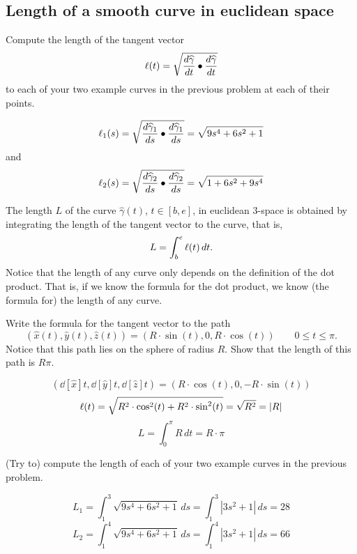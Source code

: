 \documentclass[newpage,hints,handout,nooutcomes,noauthor,12pt]{ximera}
\begin{document}
\subsection{Length of a smooth curve in euclidean space}

\begin{problem}
Compute the length of the tangent vector
\[
\l(t)=\sqrt{\frac{d\hat{\gamma}}{dt}\bullet\frac{d\hat{\gamma}}{dt}}%
\]
to each of your two example curves in the previous problem at each of
their points.



\begin{freeResponse}
\[
\ell_{1}(s) = \sqrt{\frac{d\widehat{\gamma}_{1}}{ds}\bullet\frac{d\widehat{\gamma}_{1}}{ds}} = \sqrt{9s^4 + 6s^2 +1}
\] and
\[ 
\ell_{2}(s) = \sqrt{\frac{d\widehat{\gamma}_{2}}{ds}\bullet\frac{d\widehat{\gamma}_{2}}{ds}} = \sqrt{1 + 6s^2 +9s^4}
\]
\end{freeResponse}

\end{problem}

\begin{definition}
The length $L$ of the curve $\hat{\gamma}(t)$, $t\in[b,e] $, in euclidean
$3$-space is obtained by integrating the length of the tangent vector
to the curve, that is,%
\[
L=\int_{b}^{e} \ell(t)  \,dt.
\]
Notice that the length of any curve only depends on the definition of the dot
product. That is, if we know the formula for the dot product, we know (the
formula for) the length of any curve.
\end{definition}

\begin{problem}
  Write the formula for the tangent vector to the path
  \[
  \left(\hat{x}(t),\hat{y}(t),\hat{z}(t)\right)=\left(R\cdot\sin(t),0,R\cdot\cos(t)\right) \qquad
  0 \leq t\leq\pi.
  \]
  Notice that this path lies on the sphere of radius $R$.  Show that
  the length of this path is $R\pi$.
\begin{freeResponse}
\[
\left( \dd[\hat{x}]{t}, \dd[\hat{y}]{t}, \dd[\hat{z}]{t} \right) 
    = \left(R\cdot\cos(t),0,-R\cdot\sin(t) \right)
\]
\[
\ell(t) = \sqrt{
   R^2 \cdot\cos^{2}(t) + R^2 \cdot\sin^{2}(t)} 
   = \sqrt{R^2} = |R|
\]
\[
L=\int_{0}^{\pi} R \,dt = R\cdot\pi
\]
\end{freeResponse}

\end{problem}

\begin{problem}
(Try to) compute the length of each of your two example curves in the previous
problem.

\begin{freeResponse}
\[
L_{1}= \int_{1}^{3}  \sqrt{9s^4 + 6s^2 +1} \,ds = \int_{1}^{3} |3s^2 +1| \, ds = 28
\]
\[
L_{2}= \int_{1}^{4}  \sqrt{9s^4 + 6s^2 +1} \,ds = \int_{1}^{4} |3s^2 +1| \, ds = 66
\]
\end{freeResponse}

\end{problem}
\end{document}
